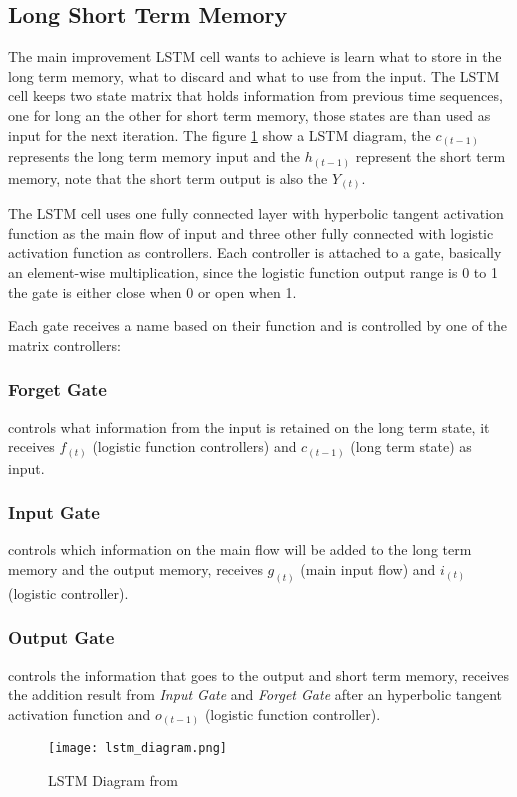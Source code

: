\subsection{Long Short Term Memory}
\label{sec:lstm}

The main improvement LSTM cell wants to achieve is learn what to store in the long term memory, what to discard and what to use from the input.
The LSTM cell keeps two state matrix that holds information from previous time sequences,
one for long an the other for short term memory,
those states are than used as input for the next iteration.
The figure \ref{fig:lstm_diagram} show a LSTM diagram, the $c_{(t-1)}$ represents the long term memory input
and the $h_{(t-1)}$ represent the short term memory, note that the short term output is also the $Y_{(t)}$.

The LSTM cell uses one fully connected layer with hyperbolic tangent activation function as the main flow of input
and three other fully connected with logistic activation function as controllers.
Each controller is attached to a gate, basically an element-wise multiplication,
since the logistic function output range is 0 to 1 the gate is either close when 0 or open when 1.

Each gate receives a name based on their function and is controlled by one of the matrix controllers:
\subsubsection{Forget Gate} controls what information from the input is retained on the long term state,
it receives $f_{(t)}$ (logistic function controllers) and $c_{(t-1)}$ (long term state) as input.
\subsubsection{Input Gate} controls which information on the main flow will be added to the long term memory and the output memory,
receives $g_{(t)}$ (main input flow) and $i_{(t)}$ (logistic controller).
\subsubsection{Output Gate} controls the information that goes to the output and short term memory,
receives the addition result from \textit{Input Gate} and \textit{Forget Gate} after an hyperbolic tangent activation function and $o_{(t-1)}$ (logistic function controller).

\begin{figure}
	\centering
	\texttt{[image: lstm\_diagram.png]}
	\caption{LSTM Diagram from \cite{geron2017hands}\label{fig:lstm_diagram}}
\end{figure}



